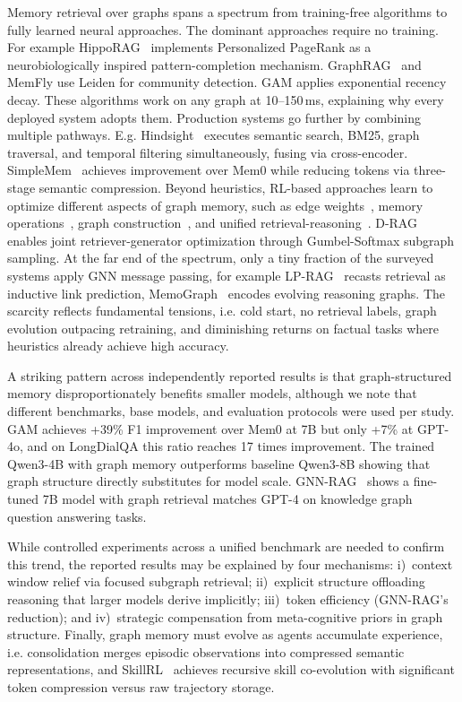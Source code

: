 \documentclass[hf]{ceurart}
\begin{document}
Memory retrieval over graphs spans a spectrum from training-free
algorithms to fully learned neural approaches. The dominant approaches require no training. For example
HippoRAG~\cite{hipporag2024} implements Personalized PageRank as a
neurobiologically inspired pattern-completion mechanism.
GraphRAG~\cite{graphrag2024} and MemFly use Leiden for community
detection. GAM applies exponential recency decay. These algorithms
work on any graph at 10--150\,ms, explaining why every deployed
system adopts them. Production systems go further by combining multiple pathways. E.g.
Hindsight~\cite{hindsight2025} executes semantic search, BM25, graph
traversal, and temporal filtering simultaneously, fusing via
cross-encoder. SimpleMem~\cite{simplemem2026} achieves improvement over
Mem0 while reducing tokens via three-stage semantic
compression. Beyond heuristics, RL-based approaches learn to optimize different
aspects of graph memory, such as edge weights~\cite{trainablegraph2025}, memory operations~\cite{memoryr12025}, graph construction~\cite{memalpha2025}, and unified retrieval-reasoning~\cite{memsearcher2025}. D-RAG~\cite{drag2025} enables
joint retriever-generator optimization through Gumbel-Softmax subgraph sampling.
At the far end of the spectrum, only a tiny fraction of the surveyed systems apply GNN message
passing, for example LP-RAG~\cite{lprag2026} recasts retrieval as inductive link
prediction, MemoGraph~\cite{memograph2026} encodes evolving reasoning
graphs. The scarcity reflects fundamental tensions, i.e. cold start, no retrieval labels, graph
evolution outpacing retraining, and diminishing returns on factual
tasks where heuristics already achieve high accuracy.

A striking pattern across independently reported results is that graph-structured memory disproportionately
benefits smaller models, although we note that different benchmarks, base models, and evaluation
protocols were used per study. GAM achieves +39\% F1 improvement over
Mem0 at 7B but only +7\% at GPT-4o, and on LongDialQA this ratio reaches
17 times improvement. The trained Qwen3-4B with graph memory
outperforms baseline Qwen3-8B showing that graph structure directly
substitutes for model scale. GNN-RAG~\cite{gnnrag2025} shows a
fine-tuned 7B model with graph retrieval matches GPT-4 on knowledge graph question answering tasks.

While controlled experiments across a unified benchmark are needed to
confirm this trend, the reported results may be explained by four
mechanisms: i)~context window relief via focused
subgraph retrieval; ii)~explicit structure offloading reasoning that
larger models derive implicitly; iii)~token efficiency (GNN-RAG's
reduction); and iv)~strategic compensation from
meta-cognitive priors in graph structure. Finally, graph memory must evolve as agents accumulate experience, i.e.
consolidation merges episodic observations into compressed semantic
representations, and
SkillRL~\cite{skillrl2026} achieves recursive skill co-evolution with
significant token compression versus raw trajectory storage.
\end{document}

